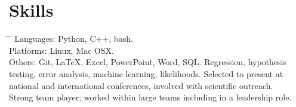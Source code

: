 \documentclass[10pt]{article} %
\begin{document}


\vspace{-2mm}
\section{Skills}
\begin{tabbing}
  \hspace{3mm} \= \hspace{30mm} \= \kill 
        {
          Languages: Python, C++, bash. \\
          \>\>Platforms: Linux, Mac OSX. \\
          \>\>Others: Git, LaTeX, Excel, PowerPoint, Word, SQL.
        }
    { Regression, hypothesis testing, error analysis, machine learning, likelihoods. }
        {
          Selected to present at national and international conferences, involved with scientific outreach.\\
          \>\>Strong team player; worked within large teams including in a leadership role.
        }
\end{tabbing}


\vspace{-9mm}
\end{document}
